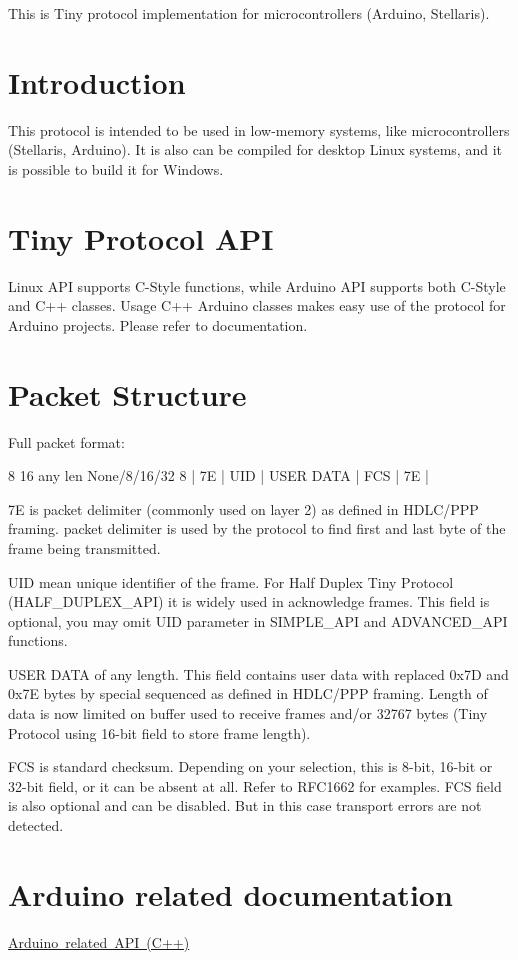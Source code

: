 This is Tiny protocol implementation for microcontrollers (Arduino, Stellaris).\hypertarget{index_introduction}{}\section{Introduction}\label{index_introduction}
This protocol is intended to be used in low-\/memory systems, like microcontrollers (Stellaris, Arduino). It is also can be compiled for desktop Linux systems, and it is possible to build it for Windows.\hypertarget{index_api}{}\section{Tiny Protocol A\+PI}\label{index_api}
Linux A\+PI supports C-\/\+Style functions, while Arduino A\+PI supports both C-\/\+Style and C++ classes. Usage C++ Arduino classes makes easy use of the protocol for Arduino projects. Please refer to documentation.\hypertarget{index_packet}{}\section{Packet Structure}\label{index_packet}
Full packet format\+: 
\begin{DoxyPre}
     8       16       any len    None/8/16/32     8
 |   7E   |  UID  |  USER DATA  |    FCS     |   7E   |
\end{DoxyPre}



\begin{DoxyItemize}
\item 7E is packet delimiter (commonly used on layer 2) as defined in H\+D\+L\+C/\+P\+PP framing. packet delimiter is used by the protocol to find first and last byte of the frame being transmitted.
\item U\+ID mean unique identifier of the frame. For Half Duplex Tiny Protocol (H\+A\+L\+F\+\_\+\+D\+U\+P\+L\+E\+X\+\_\+\+A\+PI) it is widely used in acknowledge frames. This field is optional, you may omit U\+ID parameter in S\+I\+M\+P\+L\+E\+\_\+\+A\+PI and A\+D\+V\+A\+N\+C\+E\+D\+\_\+\+A\+PI functions.
\item U\+S\+ER D\+A\+TA of any length. This field contains user data with replaced 0x7D and 0x7E bytes by special sequenced as defined in H\+D\+L\+C/\+P\+PP framing. Length of data is now limited on buffer used to receive frames and/or 32767 bytes (Tiny Protocol using 16-\/bit field to store frame length).
\item F\+CS is standard checksum. Depending on your selection, this is 8-\/bit, 16-\/bit or 32-\/bit field, or it can be absent at all. Refer to R\+F\+C1662 for examples. F\+CS field is also optional and can be disabled. But in this case transport errors are not detected.
\end{DoxyItemize}\hypertarget{index_arduino_section}{}\section{Arduino related documentation}\label{index_arduino_section}
\mbox{\hyperlink{arduino}{Arduino related A\+PI (C++)}} 